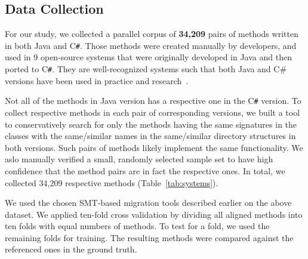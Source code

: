 \subsection{Data Collection}

For our study, we collected a parallel corpus of \textbf{34,209} pairs
of methods written in both Java and C\texttt{\#}. Those methods were
created manually by developers, and used in 9 open-source systems that
were originally developed in Java and then ported to
C\texttt{\#}. They are well-recognized systems such that both Java and
C\# versions have been used in practice and research~\cite{ase15}.

Not all of the methods in Java version has a respective one in the
C\texttt{\#} version. To collect respective methods in each pair of
corresponding versions, we built a tool to conservatively search for
only the methods having the same signatures in the classes with the
same/similar names in the same/similar directory structures in both
versions. Such pairs of methods likely implement the same
functionality. We aslo manually verified a small, randomly selected
sample set to have high confidence that the method pairs are in fact
the respective ones. In total, we collected 34,209 respective methods
(Table~\ref{tab:systems}).




We used the chosen SMT-based migration tools described earlier on the
above dataset. We applied ten-fold cross validation by dividing all
aligned methods into ten folds with equal numbers of methods. To
test for a fold, we used the remaining folds for training. The
resulting methods were compared against the referenced ones in the
ground truth.



